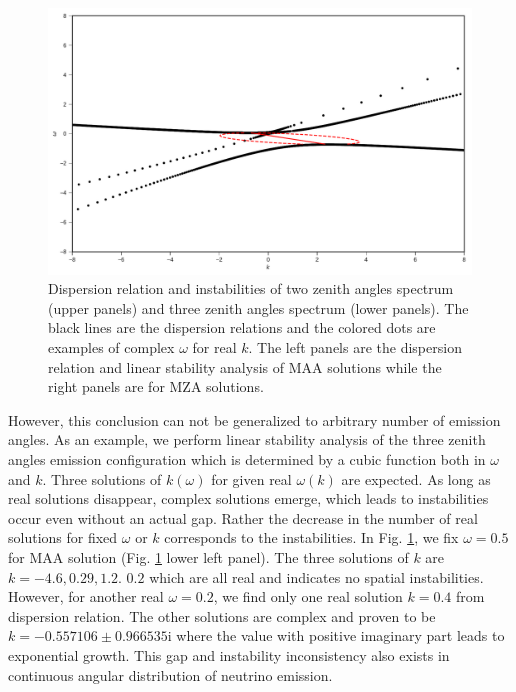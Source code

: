 \documentclass[%
preprint,
 amsmath,amssymb,
 aps,
 prd
]{revtex4-1}
\begin{document}
\begin{figure}[!htb]
\endminipage\hfill
{}
  \includegraphics[width=\linewidth]{assets/spectDB3WC4DRDBMZAPltBlob.pdf}
\endminipage\hfill
\caption{Dispersion relation and instabilities of two zenith angles spectrum (upper panels) and three zenith angles spectrum (lower panels). The black lines are the dispersion relations and the colored dots are examples of complex $\omega$ for real $k$. The left panels are the dispersion relation and linear stability analysis of MAA solutions while the right panels are for MZA solutions.}
\label{fig-dr-db}
\end{figure}


However, this conclusion can not be generalized to arbitrary number of emission angles. As an example, we perform linear stability analysis of the three zenith angles emission configuration which is determined by a cubic function both in $\omega$ and $k$. Three solutions of $k(\omega)$ for given real $\omega(k)$  are expected. As long as real solutions disappear, complex solutions emerge, which leads to instabilities occur even without an actual gap. Rather the decrease in the number of real solutions for fixed $\omega$ or $k$ corresponds to the instabilities. In Fig. \ref{fig-dr-db}, we fix $\omega= 0.5$ for MAA solution (Fig. \ref{fig-dr-db} lower left panel). The three solutions of $k$ are $k=-4.6, 0.29, 1.2$.  $0.2$ which are all real and indicates no spatial instabilities. However, for another real $\omega = 0.2$, we find only one real solution $k=0.4$ from dispersion relation. The other solutions are complex and proven to be $k = -0.557106\pm 0.966535\mathrm i$ where the value with positive imaginary part leads to exponential growth. This gap and instability inconsistency also exists in continuous angular distribution of neutrino emission.
\end{document}
